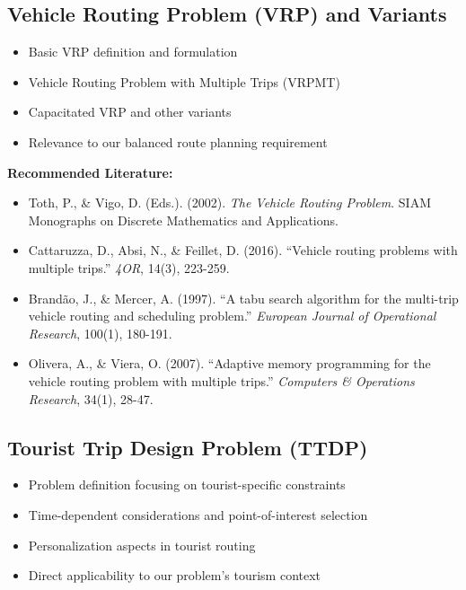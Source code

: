 \subsection{Vehicle Routing Problem (VRP) and Variants}
\begin{itemize}
    \item Basic VRP definition and formulation
    \item Vehicle Routing Problem with Multiple Trips (VRPMT)
    \item Capacitated VRP and other variants
    \item Relevance to our balanced route planning requirement
\end{itemize}

\noindent\textbf{Recommended Literature:}
\begin{itemize}
    \item Toth, P., \& Vigo, D. (Eds.). (2002). \textit{The Vehicle Routing Problem}. SIAM Monographs on Discrete Mathematics and Applications.
    \item Cattaruzza, D., Absi, N., \& Feillet, D. (2016). ``Vehicle routing problems with multiple trips.'' \textit{4OR}, 14(3), 223-259.
    \item Brandão, J., \& Mercer, A. (1997). ``A tabu search algorithm for the multi-trip vehicle routing and scheduling problem.'' \textit{European Journal of Operational Research}, 100(1), 180-191.
    \item Olivera, A., \& Viera, O. (2007). ``Adaptive memory programming for the vehicle routing problem with multiple trips.'' \textit{Computers \& Operations Research}, 34(1), 28-47.
\end{itemize}

\subsection{Tourist Trip Design Problem (TTDP)}
\begin{itemize}
    \item Problem definition focusing on tourist-specific constraints
    \item Time-dependent considerations and point-of-interest selection
    \item Personalization aspects in tourist routing
    \item Direct applicability to our problem's tourism context
\end{itemize}

